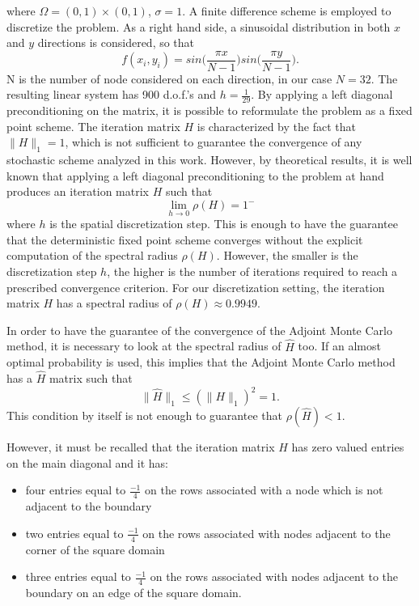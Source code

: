 where $\Omega=(0,1)\times (0,1)$, $\sigma=1$.
A finite difference scheme is employed to discretize the problem.
As a right hand side, a
sinusoidal distribution in both $x$ and $y$ directions is considered, so that
\[
 f(x_i, y_i)=sin\bigg(\frac{\pi x}{N-1}\bigg)sin\bigg(\frac{\pi y}{N-1}\bigg).
\]
N is the number of node considered on each direction, in our case $N=32$. The
resulting linear system has 900 d.o.f.'s and $h=\frac{1}{29}$.
By applying a left diagonal preconditioning on the matrix, it is possible to
reformulate the problem as a fixed point scheme.
The iteration matrix $H$ is characterized by the fact that $\lVert
H\rVert_1=1$, which is not sufficient to guarantee the convergence of
any
stochastic scheme analyzed in this work. However, by theoretical results, it is
well known that applying a left diagonal preconditioning to the problem at hand
produces an iteration matrix $H$ such that
\[
 \lim_{h\rightarrow 0}\rho(H)=1^{-}
\]
where $h$ is the spatial discretization step.
This is enough to have the guarantee that the deterministic fixed point scheme
converges without the explicit computation of the spectral radius $\rho(H)$.
However, the smaller is the discretization step $h$, the higher is the number of
iterations required to reach a prescribed convergence criterion. For our
discretization setting, the iteration matrix $H$ has a
spectral radius of $\rho(H)\approx 0.9949$.

In order to have the guarantee of the convergence of the Adjoint Monte Carlo
method, it is necessary to look at the spectral radius of $\hat{H}$ too. If an
almost optimal probability is used, this implies that
the Adjoint Monte Carlo method has a $\hat{H}$ matrix such that
\[
 \lVert \hat{H}\rVert_1\le (\rVert H\rVert_1)^2=1.
\]
This condition by itself is not enough to guarantee that
$\rho(\hat{H})<1$.

However, it must be recalled that the iteration matrix $H$ has zero
valued entries on the main diagonal and it has:
\begin{itemize}
 \item four entries equal to $\frac{-1}{4}$ on the rows associated
with a node which is not adjacent to the boundary
\item two entries equal to $\frac{-1}{4}$ on the rows associated with nodes
adjacent to the corner of the square domain
\item three entries equal to $\frac{-1}{4}$ on the rows associated with nodes
adjacent to the boundary on an edge of the square domain.
\end{itemize}

